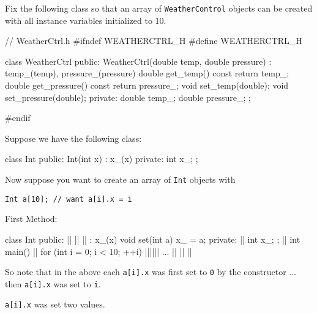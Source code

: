 \begin{ex}
Fix the following class so that an array of
\texttt{WeatherControl} objects can be created with all instance variables
initialized to 10.
\begin{console}
// WeatherCtrl.h
#ifndef WEATHERCTRL_H
#define WEATHERCTRL_H

class WeatherCtrl
{
public:
        WeatherCtrl(double temp, double pressure)
        : temp_(temp), pressure_(pressure)
        {}
        double get_temp() const { return temp_; }
        double get_pressure() const { return pressure_; }
        void set_temp(double);
        void set_pressure(double);
private:
        double temp_;
        double pressure_;
};

#endif
\end{console}
\end{ex}
Suppose we have the following class:

\begin{console}
class Int
{
public:
        Int(int x)
        : x_(x)
        {}
private:
        int x_;
};
\end{console}
Now suppose you want to create an array of \texttt{Int} objects with
\begin{center}
\texttt{Int a[10]; // want a[i].x = i}
\end{center}
First Method:
\begin{consolethree}[escapeinside=||]
class Int
{                      
public:
    || || ||  
        : x_(x) {}
    void set(int a)    
    {
        x_ = a;        
    }                  
private:                 ||  
    int x_;
};
||
int main()
{               
    ||
    for (int i = 0; i < 10; ++i)
        ||||||
    ... || || ||
}
\end{consolethree}
\newpage So note that in the above each \texttt{a[i].x} was first set to \texttt{0} by the constructor ... then \texttt{a[i].x} was set to \texttt{i}.

 \texttt{a[i].x} was set two values.

